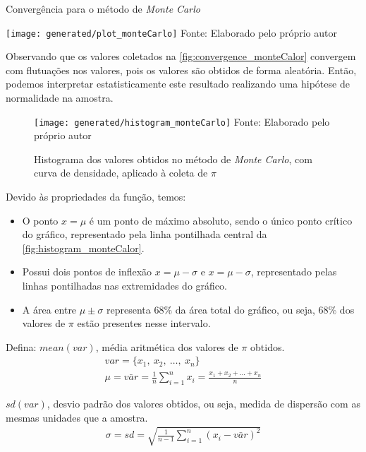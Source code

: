 \begin{graphic}[H]
   \centering
   \caption{Convergência para o método de \textit{Monte Carlo}}
   \texttt{[image: generated/plot\_monteCarlo]}
   Fonte: Elaborado pelo próprio autor
   \label{fig:convergence_monteCalor}
\end{graphic}%

Observando que os valores coletados na \autoref{fig:convergence_monteCalor} convergem com flutuações nos valores, pois os valores são obtidos de forma aleatória. Então, podemos interpretar estatisticamente este resultado realizando uma hipótese de normalidade na amostra.

\begin{figure}[H]
   \centering
   \caption{Histograma dos valores obtidos no método de \textit{Monte Carlo}, com curva de densidade, aplicado à coleta de $\pi$}
   \texttt{[image: generated/histogram\_monteCarlo]}
   Fonte: Elaborado pelo próprio autor
   \label{fig:histogram_monteCalor}
\end{figure}%

Devido às propriedades da função, temos:
\begin{itemize}
   \item O ponto $x = \mu$ é um ponto de máximo absoluto, sendo o único ponto crítico do gráfico, representado pela linha pontilhada central da \autoref{fig:histogram_monteCalor}.
   \item Possui dois pontos de inflexão $x = \mu - \sigma$ e $x = \mu - \sigma$, representado pelas linhas pontilhadas nas extremidades do gráfico.
   \item A área entre $\mu \pm \sigma$ representa $68\%$ da área total do gráfico, ou seja, $68\%$ dos valores de $\pi$ estão presentes nesse intervalo.
\end{itemize}
Defina:
$mean(var)$, média aritmética dos valores de $\pi$ obtidos.
\begin{gather*}
   var = \{x_{1},\ x_{2},\ \dots,\ x_{n}\} \\
   \mu = \bar{var} = \frac{1}{n} \sum_{i=1}^{n} x_{i} = \frac{x_{1} + x_{2} + \dots + x_{n}}{n}
\end{gather*}

$sd(var)$, desvio padrão dos valores obtidos, ou seja, medida de dispersão com as mesmas unidades que a amostra.
\begin{gather*}
   \sigma = sd = \sqrt{\frac{1}{n-1}\sum_{i=1}^{n}\left(x_{i}-\bar{var}\right)^{2}}
\end{gather*}

